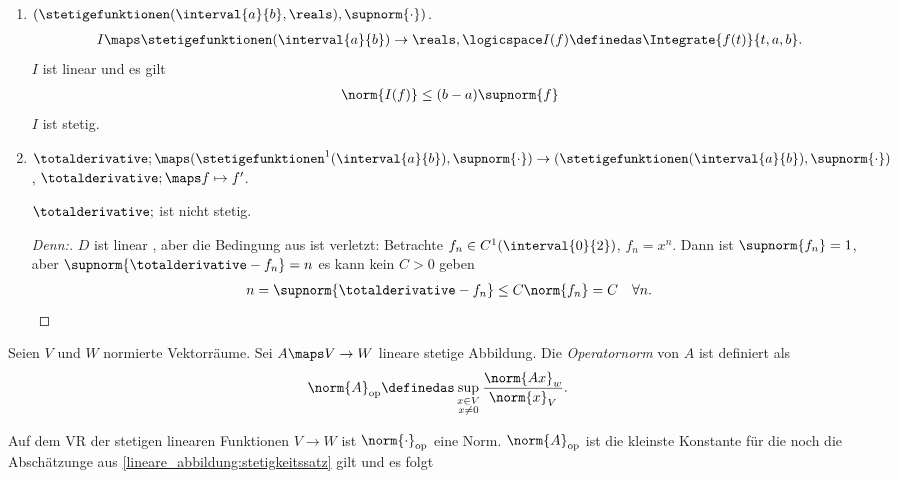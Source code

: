 \begin{beispiele*}
    \begin{enumerate}
        \item \( (\stetigefunktionen(\interval{a}{b},\reals),\supnorm{\cdot}) \).
        \begin{align*}
            I\maps \stetigefunktionen(\interval{a}{b})\to \reals,\logicspace I(f)\definedas \Integrate{f(t)}{t,a,b}.
        \end{align*}
        \( I \) ist linear und es gilt
        \begin{align*}
            \norm{I(f)}\leq (b-a)\supnorm{f}
        \end{align*}
        \timplies \( I \) ist stetig.
        \item \( \totalderivative;\maps (\stetigefunktionen^1(\interval{a}{b}),\supnorm{\cdot})\to (\stetigefunktionen(\interval{a}{b}),\supnorm{\cdot}) \), \( \totalderivative;\maps f\mapsto f' \).
        \begin{behauptung*}
            \( \totalderivative; \) ist nicht stetig.
        \end{behauptung*}
        \begin{proof}[Denn:]
            \( D \) ist linear \checkmark, aber die Bedingung aus  ist verletzt: Betrachte \( f_n\in C^1(\interval{0}{2}) \), \( f_n=x^n    \).
            Dann ist \( \supnorm{f_n}=1 \), aber \( \supnorm{\totalderivative-{f_n}}=n \) \timplies es kann kein \( C>0 \) geben \sd
            \begin{align*}
                n=\supnorm{\totalderivative-{f_n}}\leq C\norm{f_n}=C\quad \forall n.
            \end{align*}
        \end{proof}
    \end{enumerate}
\end{beispiele*}
\begin{definition*}
    Seien \( V \) und \( W \) normierte Vektorräume.
    Sei \( A\maps V\to W \) lineare stetige Abbildung.
    Die \emph{Operatornorm} von \( A \) ist definiert als
    \begin{align*}
        \norm{A}_{\text{op}}\definedas \sup_{\substack{x\in V\\ x\neq 0}}\frac{\norm{Ax}_{w}}{\norm{x}_{V}}.
    \end{align*}
\end{definition*}
    Auf dem VR der stetigen linearen Funktionen \( V\to W \) ist \( \norm{\cdot}_{\text{op}} \) eine Norm.
    \( \norm{A}_{\text{op}} \) ist die kleinste Konstante für die noch die Abschätzunge aus \ref{lineare_abbildung:stetigkeitssatz} gilt und es folgt
